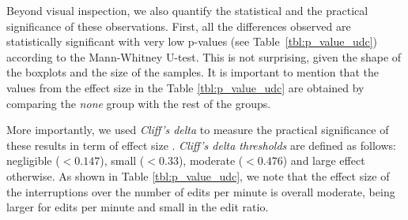 Beyond visual inspection, we also quantify the statistical and the practical significance of these observations. First, all the differences observed are statistically significant with very low p-values (see Table~\ref{tbl:p_value_udc}) according to the Mann-Whitney U-test. This is not surprising, given the shape of the boxplots and the size of the samples. It is important to mention that the values from the effect size in the Table \ref{tbl:p_value_udc} are obtained by comparing the \textit{none} group with the rest of the groups.


More importantly, we used \textit{Cliff's delta} to measure the practical significance of these results in term of effect size %
\cite{C94}. \textit{Cliff's delta thresholds} are defined as follows: negligible ($<0.147$), small  ($<0.33$), moderate ($<0.476$) and large effect otherwise. As shown in Table \ref{tbl:p_value_udc}, we note that the effect size of the interruptions over the number of edits per minute is overall moderate, being larger for edits per minute and small in the edit ratio. %

